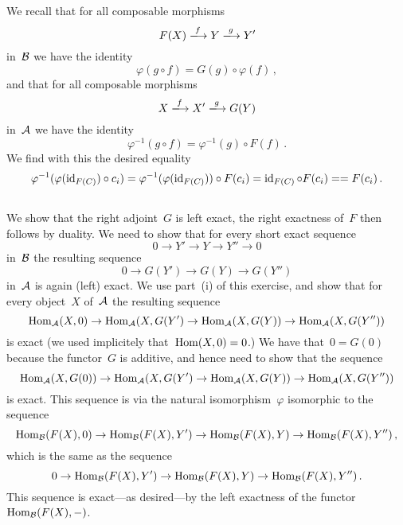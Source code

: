 We recall that for all composable morphisms
\[
  F(X)
  \xlongto{f}
  Y
  \xlongto{g}
  Y'
\]
in~$\mathcal{B}$ we have the identity
\[
  \varphi(g \circ f)
  =
  G(g) \circ \varphi(f) \,,
\]
and that for all composable morphisms
\[
  X
  \xlongto{f}
  X'
  \xlongto{g}
  G(Y)
\]
in~$\mathcal{A}$ we have the identity
\[
  \varphi^{-1}(g \circ f)
  =
  \varphi^{-1}(g) \circ F(f) \,.
\]
We find with this the desired equality
\[
  \varphi^{-1}(\varphi(\operatorname{id}_{F(C)}) \circ c_i)
  =
  \varphi^{-1}(\varphi(\operatorname{id}_{F(C)})) \circ F(c_i)
  =
  \operatorname{id}_{F(C)} \circ F(c_i)
  =
  = F(c_i) \,.
\]





\subsection{}

We show that the right adjoint~$G$ is left exact, the right exactness of~$F$ then follows by duality.
We need to show that for every short exact sequence
\[
  0
  \to
  Y'
  \to
  Y
  \to
  Y''
  \to
  0
\]
in~$\mathcal{B}$ the resulting sequence
\[
  0
  \to
  G(Y')
  \to
  G(Y)
  \to
  G(Y'')
\]
in~$\mathcal{A}$ is again (left) exact.
We use part~(i) of this exercise, and show that for every object~$X$ of~$\mathcal{A}$ the resulting sequence
\[
  \operatorname{Hom}_{\mathcal{A}}(X,0)
  \to
  \operatorname{Hom}_{\mathcal{A}}(X,G(Y')
  \to
  \operatorname{Hom}_{\mathcal{A}}(X,G(Y))
  \to
  \operatorname{Hom}_{\mathcal{A}}(X,G(Y''))
\]
is exact (we used implicitely that~$\operatorname{Hom}(X,0) = 0$.)
We have that~$0 = G(0)$ because the functor~$G$ is additive, and hence need to show that the sequence
\[
  \operatorname{Hom}_{\mathcal{A}}(X,G(0))
  \to
  \operatorname{Hom}_{\mathcal{A}}(X,G(Y')
  \to
  \operatorname{Hom}_{\mathcal{A}}(X,G(Y))
  \to
  \operatorname{Hom}_{\mathcal{A}}(X,G(Y''))
\]
is exact.
This sequence is via the natural isomorphism~$\varphi$ isomorphic to the sequence
\[
  \operatorname{Hom}_{\mathcal{B}}(F(X),0)
  \to
  \operatorname{Hom}_{\mathcal{B}}(F(X),Y')
  \to
  \operatorname{Hom}_{\mathcal{B}}(F(X),Y)
  \to
  \operatorname{Hom}_{\mathcal{B}}(F(X),Y'') \,,
\]
which is the same as the sequence
\[
  0
  \to
  \operatorname{Hom}_{\mathcal{B}}(F(X),Y')
  \to
  \operatorname{Hom}_{\mathcal{B}}(F(X),Y)
  \to
  \operatorname{Hom}_{\mathcal{B}}(F(X),Y'') \,.
\]
This sequence is exact---as desired---by the left exactness of the functor~$\operatorname{Hom}_{\mathcal{B}}(F(X),-)$.






